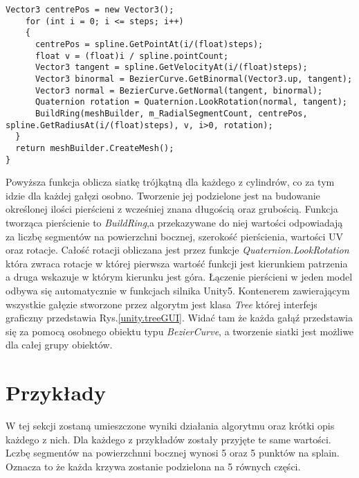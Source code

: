 \documentclass[12pt]{report}
\renewcommand{\figurename}{Rys.}
\begin{document}
\begin{sloppypar}
\begin{lstlisting}[label=buildMesh,caption=Funkcja tworzaca cylinder w okół punktu krzywej. ,belowcaptionskip=4pt,captionpos=b]
  Vector3 centrePos = new Vector3();
    for (int i = 0; i <= steps; i++)
    {
      centrePos = spline.GetPointAt(i/(float)steps);
      float v = (float)i / spline.pointCount;
      Vector3 tangent = spline.GetVelocityAt(i/(float)steps);
      Vector3 binormal = BezierCurve.GetBinormal(Vector3.up, tangent);
      Vector3 normal = BezierCurve.GetNormal(tangent, binormal);
      Quaternion rotation = Quaternion.LookRotation(normal, tangent);
      BuildRing(meshBuilder, m_RadialSegmentCount, centrePos, spline.GetRadiusAt(i/(float)steps), v, i>0, rotation);
  }
  return meshBuilder.CreateMesh();
}
\end{lstlisting}
Powyższa funkcja oblicza siatkę trójkątną dla każdego z cylindrów, co za tym idzie dla każdej gałęzi osobno. Tworzenie jej podzielone jest na budowanie określonej ilości pierścieni z wcześniej znana długością oraz grubością. Funkcja tworząca pierścienie to \textit{BuildRing},a przekazywane do niej wartości odpowiadają za liczbę segmentów na powierzchni bocznej, szerokość pierścienia, wartości UV oraz rotacje. Całość rotacji obliczana jest przez funkcje \textit{Quaternion.LookRotation} która zwraca rotacje w której pierwsza wartość funkcji jest kierunkiem patrzenia a druga wskazuje w którym kierunku jest góra.
Łączenie pierścieni w jeden model odbywa się automatycznie w funkcjach silnika Unity5. Kontenerem zawierającym wszystkie gałęzie stworzone przez algorytm jest klasa \textit{Tree} której interfejs graficzny przedstawia \figurename\ref{unity.treeGUI}. Widać tam że każda gałąź przedstawia się za pomocą osobnego obiektu typu \textit{BezierCurve}, a tworzenie siatki jest możliwe dla całej grupy obiektów.
\newpage
\section{Przykłady}
W tej sekcji zostaną umieszczone wyniki działania algorytmu oraz krótki opis każdego z nich. Dla każdego z przykładów zostały przyjęte te same wartości. Lczbę segmentów na powierzchnni bocznej wynosi 5 oraz 5 punktów na splain. Oznacza to że każda krzywa zostanie podzielona na 5 równych części.



\end{sloppypar}
\end{document}
